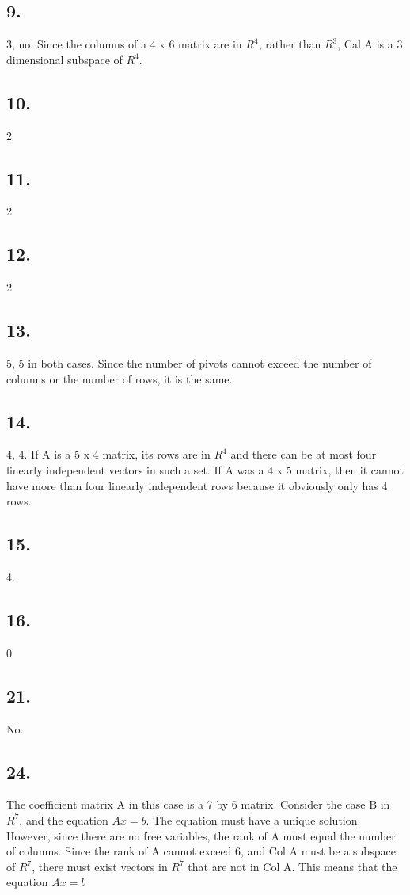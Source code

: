 \documentclass[12]{scrartcl}
\begin{document}
\subsection*{9.}
3, no. Since the columns of a 4 x 6 matrix are in $R^4$, rather than $R^3$,  Cal A is a 3 dimensional subspace of $R^4$. 
\subsection*{10.}
2
\subsection*{11.}
2
\subsection*{12.}
2
\subsection*{13.}
5, 5 in both cases. Since the number of pivots cannot exceed the number of columns or the number of rows, it is the same. 
\subsection*{14.}
4, 4. If A is a 5 x 4 matrix, its rows are in $R^4$ and there can be at most four linearly independent vectors in such a set. If A was a 4 x 5 matrix, then it cannot have more than four linearly independent rows because it obviously only has 4 rows. 
\subsection*{15.}
4. 
\subsection*{16.}
0
\subsection*{21.}
No. 
\subsection*{24.}
The coefficient matrix A in this case is a 7 by 6 matrix. Consider the case B in $R^7$, and the equation $Ax = b$. The equation must have a unique solution. However, since there are no free variables, the rank of A must equal the number of columns. Since the rank of A cannot exceed 6, and Col A must be a subspace of $R^7$, there must exist vectors in $R^7$ that are not in Col A. This means that the equation $Ax = b$
\end{document}

